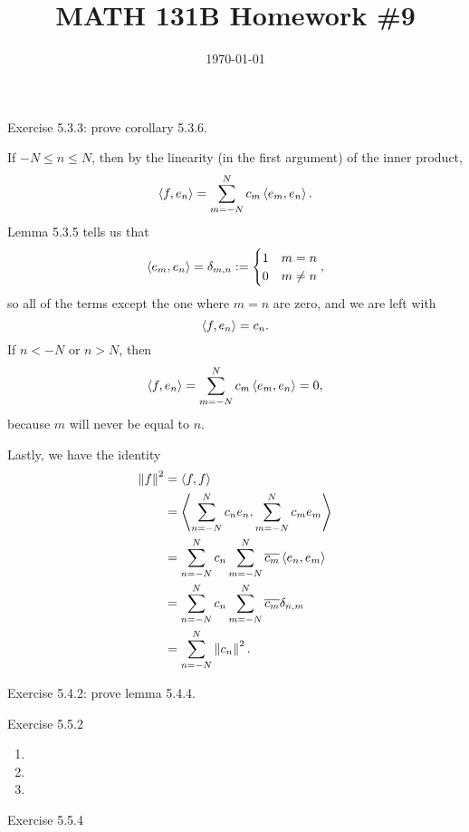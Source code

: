 \documentclass{article}
\date{\today}
\title{MATH 131B Homework \#9}
\begin{document}
\maketitle

\begin{prob}
    Exercise 5.3.3: prove corollary 5.3.6.
\end{prob}
If $-N \leq n \leq N$, then by the linearity (in the first argument) of the inner product,
\[ \left\langle f,e_n \right\rangle = \sum_{m=-N}^N c_m \left\langle e_m,e_n \right\rangle. \]
Lemma 5.3.5 tells us that
\[ \left\langle e_m,e_n \right\rangle = \delta_{m,n} := \begin{cases}
    1 & m=n \\
    0 & m \neq n
\end{cases}, \]
so all of the terms except the one where $m=n$ are zero, and we are left with
\[ \left\langle f,e_n \right\rangle=c_n. \]
If $n<-N$ or $n>N$, then
\[ \left\langle f,e_n \right\rangle = \sum_{m=-N}^N c_m \left\langle e_m,e_n \right\rangle = 0, \]
because $m$ will never be equal to $n$.
\par
Lastly, we have the identity
\begin{align*}
    \left\lVert f\right\rVert^2 &= \left\langle f,f \right\rangle \\
               &= \left\langle \sum_{n=-N}^N c_n e_n , \sum_{m=-N}^N c_m e_m \right\rangle \\
               &= \sum_{n=-N}^N c_n \sum_{m=-N}^N \overline{c_m} \left\langle e_n, e_m \right\rangle \\
               &= \sum_{n=-N}^N c_n \sum_{m=-N}^N \overline{c_m} \delta_{n,m} \\
               &= \sum_{n=-N}^N \left\lVert c_n\right\rVert^2. \\
\end{align*}

\bigskip
\begin{prob}
    Exercise 5.4.2: prove lemma 5.4.4.
\end{prob}

\bigskip
\begin{prob}
    Exercise 5.5.2
\end{prob}
\begin{enumerate}[label=(\alph*)]
    \item
    \item
    \item
\end{enumerate}


\bigskip
\begin{prob}
    Exercise 5.5.4
\end{prob}


\end{document}
